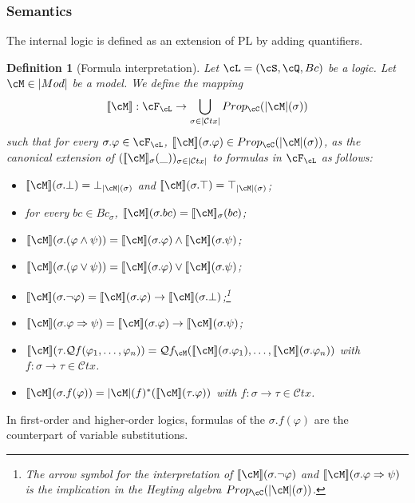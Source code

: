 \documentclass[preprint,3p,times]{elsarticle}
\newtheorem{definition}{Definition}[section]
\def\sem#1{[\![ #1 ] \!]}
\newcommand{\Ctx}{\mathcal{C}tx}
\newcommand{\Qf}{\mathcal{Q}f}
\begin{document}
\subsubsection{Semantics}

The internal logic is defined as an extension of PL by adding quantifiers. 

\begin{definition}[Formula interpretation]
\label{def:formula interpretation}
Let $\cL = (\cS,\cQ,Bc)$ be a logic. Let $\cM \in |Mod|$ be a model. We define the mapping 
\[\sem{\cM} : \cF_\cL \to \bigcup_{\sigma \in |\Ctx|}Prop_\cC(|\cM|(\sigma))\] 
such that for every $\sigma.\varphi \in \cF_\cL$, $\sem{\cM}(\sigma.\varphi) \in Prop_\cC(|\cM|(\sigma))$, as the canonical extension of $(\sem{\cM}_\sigma(\_))_{\sigma \in |\Ctx|}$ to formulas in $\cF_\cL$ as follows:

\begin{itemize}
\item $\sem{\cM}(\sigma.\bot) = \bot_{|\cM|(\sigma)}$ and $\sem{\cM}(\sigma.\top) = \top_{|\cM|(\sigma)}$;
\item for every $bc \in Bc_\sigma$, $\sem{\cM}(\sigma.bc) = \sem{\cM}_\sigma(bc)$;
\item $\sem{\cM}(\sigma.(\varphi \wedge \psi)) = \sem{\cM}(\sigma.\varphi) \wedge \sem{\cM}(\sigma.\psi)$; 
\item $\sem{\cM}(\sigma.(\varphi \vee \psi)) = \sem{\cM}(\sigma.\varphi) \vee \sem{\cM}(\sigma.\psi)$;
\item $\sem{\cM}(\sigma.\neg \varphi) = \sem{\cM}(\sigma.\varphi) \to \sem{\cM}(\sigma.\bot)$;\footnote{The arrow symbol for the interpretation of \(\sem{\cM}(\sigma.\neg \varphi)\) and \(\sem{\cM}(\sigma.\varphi \Rightarrow \psi)\) is the implication in the Heyting algebra \(Prop_\cC(|\cM|(\sigma))\).}
\item $\sem{\cM}(\sigma.\varphi \Rightarrow \psi) = \sem{\cM}(\sigma.\varphi) \to \sem{\cM}(\sigma.\psi)$;
\item $\sem{\cM}(\tau.\Qf(\varphi_1,\ldots,\varphi_n)) = \Qf_\cM(\sem{\cM}(\sigma.\varphi_1),\ldots,\sem{\cM}(\sigma.\varphi_n))$ with $f : \sigma \to \tau \in \Ctx$.
\item $\sem{\cM}(\sigma.f(\varphi)) = |\cM|(f)^*(\sem{\cM}(\tau.\varphi))$ with $f : \sigma \to \tau \in \Ctx$.
\end{itemize} 
\end{definition}

In first-order and higher-order logics, formulas of the $\sigma.f(\varphi)$ are the counterpart of variable substitutions. 
\end{document}
